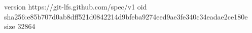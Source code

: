 version https://git-lfs.github.com/spec/v1
oid sha256:e85b707d0ab8dff521d0842214d9bfeba9274eed9ae3fe340c34eadae2ce180e
size 32864
